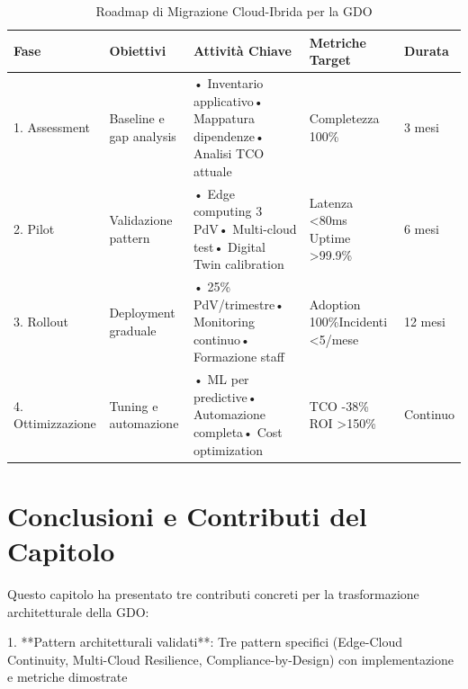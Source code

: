 \begin{table}[htbp]
\centering
\caption{Roadmap di Migrazione Cloud-Ibrida per la GDO}
\label{tab:migration_roadmap}
\begin{tabular}{p{2cm}p{4cm}p{4cm}p{3cm}p{2cm}}
\toprule
\textbf{Fase} & \textbf{Obiettivi} & \textbf{Attività Chiave} & \textbf{Metriche Target} & \textbf{Durata} \\
\midrule
\rowcolor{gray!10}
1. Assessment & Baseline e gap analysis & • Inventario applicativo\newline• Mappatura dipendenze\newline• Analisi TCO attuale & Completezza 100\% & 3 mesi \\

2. Pilot & Validazione pattern & • Edge computing 3 PdV\newline• Multi-cloud test\newline• Digital Twin calibration & Latenza <80ms \newline Uptime >99.9\% & 6 mesi \\

\rowcolor{gray!10}
3. Rollout & Deployment graduale & • 25\% PdV/trimestre\newline• Monitoring continuo\newline• Formazione staff & Adoption 100\%\newline Incidenti <5/mese & 12 mesi \\

4. Ottimizzazione & Tuning e automazione & • ML per predictive\newline• Automazione completa\newline• Cost optimization & TCO -38\% \newline ROI >150\% & Continuo \\
\bottomrule
\end{tabular}
\end{table}

\section{\texorpdfstring{Conclusioni e Contributi del Capitolo}{3.6 - Conclusioni e Contributi del Capitolo}}

Questo capitolo ha presentato tre contributi concreti per la trasformazione architetturale della GDO:

1. **Pattern architetturali validati**: Tre pattern specifici (Edge-Cloud Continuity, Multi-Cloud Resilience, Compliance-by-Design) con implementazione e metriche dimostrate

